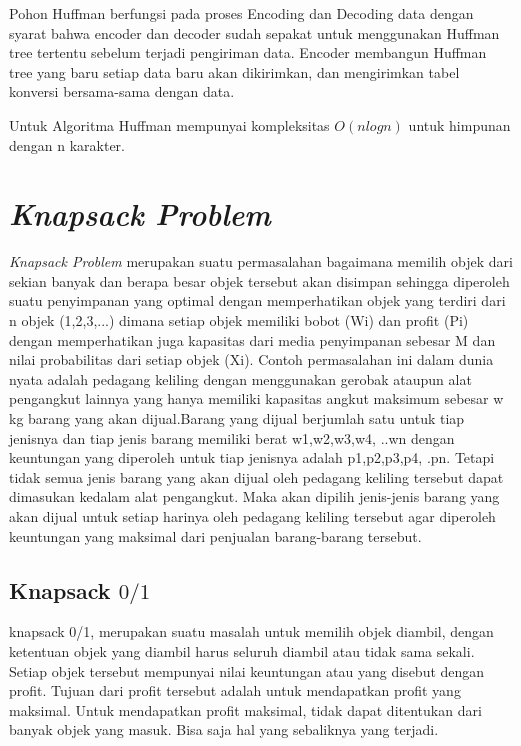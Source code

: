 Pohon Huffman berfungsi pada proses Encoding dan Decoding data dengan syarat bahwa encoder dan decoder sudah sepakat untuk menggunakan Huffman tree tertentu sebelum terjadi pengiriman data. Encoder membangun Huffman tree yang baru setiap data baru akan dikirimkan, dan mengirimkan tabel konversi bersama-sama dengan data.

Untuk Algoritma Huffman mempunyai kompleksitas $O(n log n)$ untuk himpunan dengan n karakter.	

\section{\textit{Knapsack Problem}}

\textit{Knapsack Problem} merupakan suatu permasalahan bagaimana memilih objek dari sekian banyak dan  berapa besar objek tersebut akan disimpan sehingga diperoleh suatu penyimpanan yang optimal dengan memperhatikan objek yang terdiri dari n objek (1,2,3,...) dimana setiap objek memiliki  bobot (Wi) dan profit (Pi) dengan memperhatikan juga kapasitas dari media penyimpanan sebesar M dan nilai probabilitas dari setiap objek (Xi). Contoh permasalahan ini dalam dunia nyata adalah pedagang keliling dengan menggunakan gerobak ataupun alat pengangkut lainnya yang hanya memiliki kapasitas angkut maksimum sebesar w kg barang yang akan dijual.Barang yang dijual berjumlah satu untuk tiap jenisnya dan tiap jenis barang memiliki berat w1,w2,w3,w4, ..wn dengan keuntungan yang diperoleh untuk tiap jenisnya adalah p1,p2,p3,p4, .pn. Tetapi tidak semua jenis barang yang akan dijual oleh pedagang keliling tersebut dapat dimasukan kedalam alat pengangkut. Maka akan dipilih jenis-jenis barang yang akan dijual untuk setiap harinya oleh pedagang keliling tersebut agar diperoleh keuntungan yang maksimal dari penjualan barang-barang  tersebut. 

\subsection{Knapsack $0/1$}
knapsack 0/1, merupakan suatu masalah untuk memilih objek diambil, dengan ketentuan objek yang diambil harus seluruh diambil atau tidak sama sekali. Setiap   objek  tersebut mempunyai   nilai   keuntungan   atau   yang   disebut   dengan   profit.	Tujuan dari profit tersebut adalah untuk mendapatkan profit   yang   maksimal. Untuk   mendapatkan profit maksimal, tidak dapat ditentukan dari  banyak   objek   yang   masuk. Bisa saja hal yang sebaliknya yang terjadi. 


